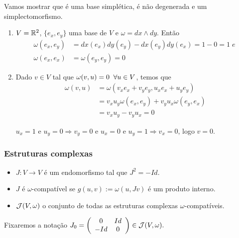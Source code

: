 \documentclass{beamer}
\begin{document}
	\begin{frame}
		\begin{tiny}
			Vamos mostrar que é uma base simplética, é não degenerada e um simplectomorfismo.
		\end{tiny}
		\begin{exemplo}
			\begin{enumerate}
				\item $V = \mathbb{R}^{2}$, $\{e_{x}, e_{y}\}$ uma base de $V$ e $\omega=dx \wedge dy$. Então 
				$$
				\begin{aligned}
					\omega(e_{x}, e_{y}) &=dx(e_{x}) dy(e_{y}) - dx(e_{y}) dy(e_{x}) = 1-0= 1 \; e\; 
					\\
					\omega(e_{x}, e_{x}) &= \omega(e_{y}, e_{y}) = 0	
				\end{aligned}
				$$ 
				
				\item Dado $v \in V$ tal que $\omega(v, u)=0 \;\;\forall u \in V$, temos que 
				$$
				\begin{aligned}
					\omega(v, u) &= \omega(v_{x}e_{x}+v_{y}e_{y}, u_{x}e_{x}+u_{y}e_{y})
					\\
					&=
					v_{x}u_{y}\omega(e_{x}, e_{y}) +v_{y}u_{x}\omega(e_{y}, e_{x})
					\\
					&= v_{x}u_{y} -v_{y}u_{x} = 0
				\end{aligned}
				$$
				
				$u_{x} = 1$ e $u_{y} = 0 \Rightarrow v_{y} = 0$ e $u_{x} = 0$ e $u_{y} = 1 \Rightarrow v_{x} = 0$, logo $v=0$.
				
			\end{enumerate}			
		\end{exemplo}
	\end{frame}
	
	\begin{frame}
		\frametitle{Estruturas complexas}
		
		\begin{definicao}
			\begin{itemize}
				\item $J: V \to V$ é um endomorfismo tal que $J^{2} = -Id$. 
				
				\item $J$ é $\omega$-compatível se $g(u,v):=\omega(u, Jv)$ é um produto interno. 
				
				\item $\mathcal{J}(V, \omega)$ o conjunto de todas as estruturas complexas $\omega$-compatíveis.
				
			\end{itemize}
		\end{definicao}
		Fixaremos a notação
			$
			J_{0}=
			\left(
			\begin{array}{cc}
			0 & Id
			\\
			-Id & 0
			\end{array}
			\right) \in \mathcal{J}(V, \omega) .
			$
	\end{frame}
	
\end{document}

